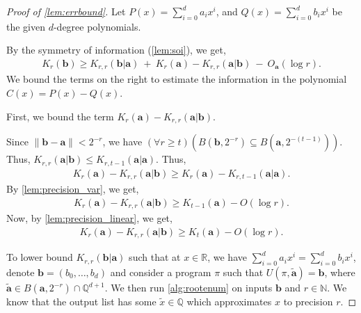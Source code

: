 \documentclass[a4paper,UKenglish,cleveref,autoref,thm-restate]{lipics-v2021}
\newcommand{\N}{\mathbb{N}}
\newcommand{\Q}{\mathbb{Q}}
\newcommand{\R}{\mathbb{R}}
\begin{document}
\begin{proof}[Proof of \cref{lem:errbound}]
	Let $P(x)=\sum_{i=0}^d a_i x^i$, and $Q(x)=\sum_{i=0}^d b_i x^i$ be
	the given $d$-degree polynomials.
	
	By the symmetry of information (\cref{lem:soi}), we get,
	\begin{align*}
		K_r(\mathbf{b})\geq
		K_{r,r}(\mathbf{b}|\mathbf{a})~+~
		K_r(\mathbf{a})-K_{r,r}(\mathbf{a}|\mathbf{b})~-~
		O_{\mathbf{a}}(\log r).
	\end{align*}
	We bound the terms on the right to estimate the information in the
	polynomial $C(x)=P(x)-Q(x)$.
	
	First, we bound the term
	$K_r(\mathbf{a})-K_{r,r}(\mathbf{a}|\mathbf{b})$.
	
	Since $\|\mathbf{b}-\mathbf{a}\| < 2^{-r}$, we have
	$\left(\forall r\geq t\right)\left(B(\mathbf{b},2^{-r})\subseteq
	B(\mathbf{a},2^{-(t-1)})\right)$. Thus,
	$K_{r,r}(\mathbf{a}|\mathbf{b})\leq K_{r,t-1}(\mathbf{a}|\mathbf{a})$.
	Thus,
	\begin{align*}
		K_r(\mathbf{a})-K_{r,r}
		(\mathbf{a}|\mathbf{b})\geq K_r(\mathbf{a})-K_{r,t-1}(\mathbf{a}|\mathbf{a}).
	\end{align*}
	By \cref{lem:precision_var}, we get, 
	\begin{align*}
		K_r(\mathbf{a})-K_{r,r}(\mathbf{a}|\mathbf{b})\geq K_{t-1}(\mathbf{a})-O(\log r).
	\end{align*}
	Now, by \cref{lem:precision_linear}, we get, 
	\begin{align}
		\label{ineq:errorbound_one}
		K_r(\mathbf{a})-K_{r,r}(\mathbf{a}|\mathbf{b})\geq K_t(\mathbf{a})-O(\log r).
	\end{align}
	
	
	To lower bound $K_{r,r}(\mathbf{b}|\mathbf{a})$ such that at $x\in\R$,
	we have $\sum_{i=0}^d a_i x^i = \sum_{i=0}^d b_i x^i$, denote
	$\mathbf{b}=(b_0,\dots,b_{d})$ and consider a program $\pi$ such
	that $U(\pi,\tilde{\mathbf{a}}) = \mathbf{b}$, where
	$\tilde{\mathbf{a}} \in B(\mathbf{a},2^{-r})\cap\Q^{d+1}$. We then
	run \cref{alg:rootenum} on inputs $\mathbf{b}$ and $r \in \N$. We
	know that the output list has some $\tilde{x}\in\Q$ which
	approximates $x$ to precision $r$.
	

\end{proof}
\end{document}
